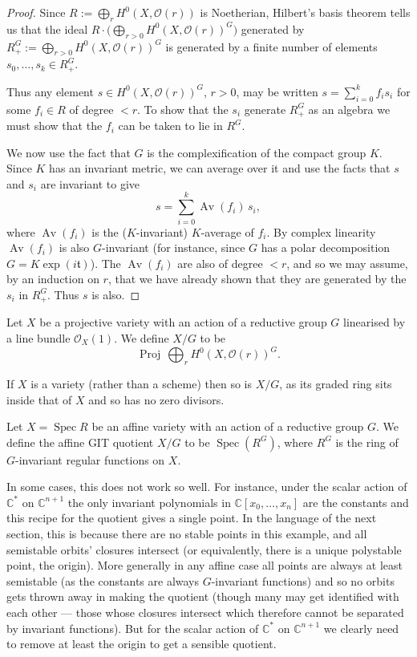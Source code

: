 \documentclass[12pt]{article}
\begin{document}
\begin{proof}
  Since $R := \bigoplus_r H^0(X,\mathcal{O}(r))$ is Noetherian, Hilbert’s basis theorem tells
  us that the ideal $R\cdot \big(\bigoplus_{r>0} H^0(X,\mathcal{O}(r))^G\big)$ generated by
  $R^G_{+} := \bigoplus_{r>0} H^0(X,\mathcal{O}(r))^G$ is generated by a finite number of
  elements $s_0,\ldots,s_k \in R^G_{+}$.

  Thus any element $s \in H^0(X,\mathcal{O}(r))^G$, $r>0$, may be written
  $s = \sum_{i=0}^k f_i s_i$ for some $f_i \in R$ of degree $<r$. To show that the $s_i$
  generate $R^G_{+}$ as an algebra we must show that the $f_i$ can be taken to lie in $R^G$.

  We now use the fact that $G$ is the complexification of the compact group $K$. Since
  $K$ has an invariant metric, we can average over it and use the facts that $s$ and $s_i$
  are invariant to give
  \[
    s = \sum_{i=0}^k \operatorname{Av}(f_i)\, s_i,
  \]
  where $\operatorname{Av}(f_i)$ is the ($K$-invariant) $K$-average of $f_i$. By complex
  linearity $\operatorname{Av}(f_i)$ is also $G$-invariant (for instance, since $G$ has a
  polar decomposition $G = K \exp(i\mathfrak{t})$). The $\operatorname{Av}(f_i)$ are also of
  degree $<r$, and so we may assume, by an induction on $r$, that we have already shown that
  they are generated by the $s_i$ in $R^G_{+}$. Thus $s$ is also.
\end{proof}

\begin{definition}
  Let $X$ be a projective variety with an action of a reductive group $G$ linearised by a line bundle $\mathcal{O}_X(1)$. We define $X/G$ to be
  \[
    \operatorname{Proj}\, \bigoplus_r H^0(X,\mathcal{O}(r))^G.
  \]
\end{definition}
If $X$ is a variety (rather than a scheme) then so is $X/G$, as its graded ring sits inside
that of $X$ and so has no zero divisors.

\begin{definition}
  Let $X = \operatorname{Spec} R$ be an affine variety with an action of a reductive group $G$. We define the affine GIT quotient $X/G$ to be $\operatorname{Spec}(R^G)$, where $R^G$ is the ring of $G$-invariant regular functions on $X$.
\end{definition}
In some cases, this does not work so well. For instance, under the scalar action of
$\mathbb{C}^*$ on $\mathbb{C}^{n+1}$ the only invariant polynomials in
$\mathbb{C}[x_0,\dots,x_n]$ are the constants and this recipe for the quotient gives a
single point. In the language of the next section, this is because there are no stable
points in this example, and all semistable orbits’ closures intersect (or equivalently,
there is a unique polystable point, the origin). More generally in any affine case all
points are always at least semistable (as the constants are always $G$-invariant functions)
and so no orbits gets thrown away in making the quotient (though many may get identified
with each other — those whose closures intersect which therefore cannot be separated
by invariant functions). But for the scalar action of $\mathbb{C}^*$ on $\mathbb{C}^{n+1}$
we clearly need to remove at least the origin to get a sensible quotient.
\end{document}
